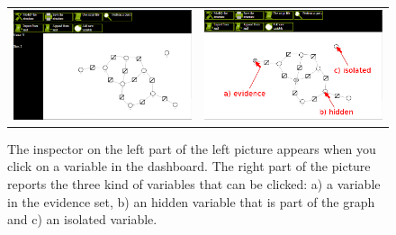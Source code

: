\begin{figure}
	\centering
\begin{tabular}{ll}
\begin{minipage}[t]{0.49\textwidth}
	\includegraphics[width= \columnwidth]{../src/Chapter_additional/04_EFG_GUI/image/img_07.png}
\end{minipage}
 &
\begin{minipage}[t]{0.49\textwidth}
	\includegraphics[width= \columnwidth]{../src/Chapter_additional/04_EFG_GUI/image/img_08.png}
\end{minipage}
\end{tabular}
	\caption{The inspector on the left part of the left picture appears when you click on a variable in the dashboard. The right part of the picture reports the three kind of variables that can be clicked: a) a variable in the evidence set, b) an hidden variable that is part of the graph and c) an isolated variable.}
	\label{fig:inspector}
\end{figure}

